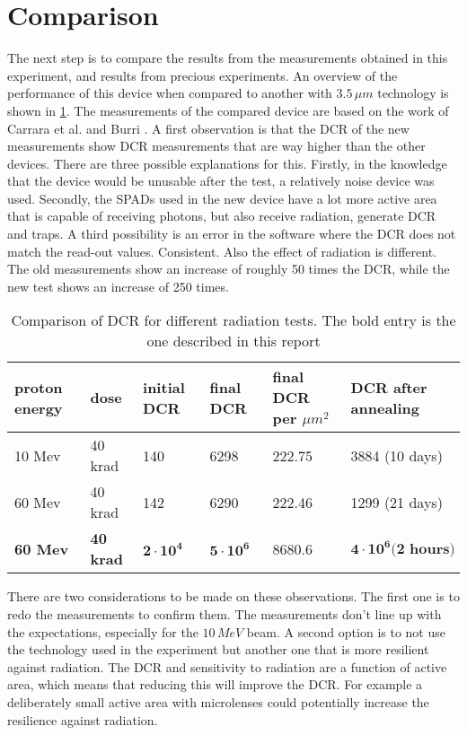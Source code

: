 \clearpage
\section{Comparison}\label{ssec:results}

The next step is to compare the results from the measurements obtained in this experiment, and results from precious experiments. An overview of the performance of this device when compared to another with $3.5\,\mu m$ technology is shown in \cref{tab:comparison}. The measurements of the compared device are based on the work of Carrara et al. \cite{carrara2009gamma} and Burri \cite{burri2016thesis}. A first observation is that the DCR of the new measurements show DCR measurements that are way higher than the other devices. There are three possible explanations for this. Firstly, in the knowledge that the device would be unusable after the test, a relatively noise device was used. Secondly, the SPADs used in the new device have a lot more active area that is capable of receiving photons, but also receive radiation, generate DCR and traps. A third possibility is an error in the software where the DCR does not match the read-out values. Consistent. Also the effect of radiation is different. The old measurements show an increase of roughly 50 times the DCR, while the new test shows an increase of 250 times.

\begin{table}[h]
		\centering
\caption{Comparison of DCR for different radiation tests. The bold entry is the one described in this report}
\label{tab:comparison}
\begin{tabular}{|ll|llll|} \hline
\textbf{proton energy} & dose             & initial DCR       & final DCR   & final DCR per $\mu m^2$   & DCR after annealing \\ \hline
10 Mev                 & 40 krad          & 140               & 6298        & 222.75          & 3884 (10 days)                    \\
60 Mev                 & 40 krad          & 142               & 6290        & 222.46               & 1299 (21 days)                    \\
\textbf{60 Mev}        & \textbf{40 krad} & $\mathbf{2\cdot10^4}$ & $\mathbf{5\cdot10^6}$& 8680.6  & $\mathbf{4\cdot10^6 \textbf{(2 hours)}}$      \\  \hline
\end{tabular}
\end{table}

There are two considerations to be made on these observations. The first one is to redo the measurements to confirm them. The measurements don't line up with the expectations, especially for the $10\,MeV$ beam. A second option is to not use the technology used in the experiment but another one that is more resilient against radiation. The DCR and sensitivity to radiation are a function of active area, which means that reducing this will improve the DCR. For example a deliberately small active area with microlenses could potentially increase the resilience against radiation.
